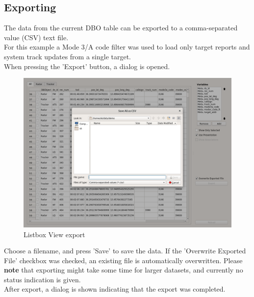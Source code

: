 \subsection{Exporting}
\label{sec:exporting}

The data from the current DBO table can be exported to a comma-separated value (CSV) text file. \\

For this example a Mode 3/A code filter was used to load only target reports and system track updates from a single target. \\

When pressing the 'Export' button, a dialog is opened.

\begin{figure}[H]
    \hspace*{-2cm}
    \includegraphics[width=18cm,frame]{../screenshots/listbox_export.png}
  \caption{Listbox View export}
\end{figure}

Choose a filename, and press 'Save' to save the data. If the 'Overwrite Exported File' checkbox was checked, an existing file is automatically overwritten. Please \textbf{note} that exporting might take some time for larger datasets, and currently no status indication is given.\\

After export, a dialog is shown indicating that the export was completed.


